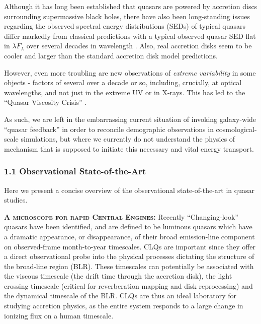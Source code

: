 \smallskip 
\smallskip
\noindent
Although it has long been established that quasars are powered by
accretion discs surrounding supermassive black holes, there have also
been long-standing issues regarding the observed spectral energy
distributions (SEDs) of typical quasars
\citep[e.g.,][]{Koratkar_Blaes1999, Sirko_Goodman2003} differ markedly
from classical predictions \citep[][]{SS73, Pringle1981} with a
typical observed quasar SED flat in $\lambda F_{\lambda}$ over several
decades in wavelength \citep{Elvis1994, Richards2006b}.  Also, real
accretion disks seem to be cooler \cite[e.g., ][]{Lawrence2012} and
larger \cite[e.g.,][]{Pooley2007, Morgan2010, Morgan2012,
Mosquera2011} than the standard accretion disk model predictions.

\smallskip 
\smallskip
\noindent
However, even more troubling are new observations of {\it extreme
variability} in some objects - factors of several over a decade or so,
including, crucially, at optical wavelengths, and not just in the
extreme UV or in X-rays. This has led to the ``Quasar Viscosity
Crisis'' \citep{Lawrence2018}. 

\smallskip 
\smallskip
\noindent
As such, we are left in the embarrassing current situation of invoking
galaxy-wide ``quasar feedback'' in order to reconcile demographic
observations in cosmological-scale simulations, but where we currently
do not understand the physics of mechanism that is supposed to
initiate this necessary and vital energy transport.



\subsubsection*{1.1 Observational State-of-the-Art}
Here we present a concise overview of the observational state-of-the-art 
in quasar studies. 

\smallskip
\smallskip
\noindent
\textbf{\textsc{A microscope for rapid Central Engines:}}
Recently ``Changing-look'' quasars \citep[CLQs; ][]{LaMassa2015,
Runnoe2016, Ruan2016, Runco2016, MacLeod2016, Yang2017} have been
identified, and are defined to be luminous quasars which have a
dramatic appearance, or disappearance, of their broad emission-line
component on observed-frame month-to-year timescales.  CLQs are
important since they offer a direct observational probe into the
physical processes dictating the structure of the broad-line region
(BLR). These timescales can potentially be associated with the viscous
timescale (the drift time through the accretion disk), the light
crossing timescale (critical for reverberation mapping and disk
reprocessing) and the dynamical timescale of the BLR.  CLQs are thus
an ideal laboratory for studying accretion physics, as the entire
system responds to a large change in ionizing flux on a human
timescale.

